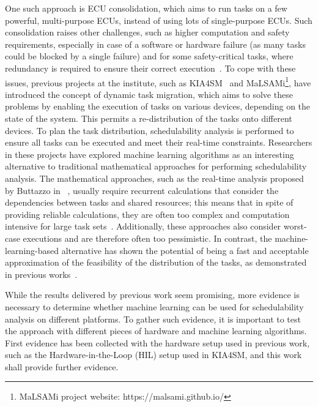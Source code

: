 One such approach is ECU consolidation, which aims to run tasks on a few powerful, multi-purpose ECUs, instead of using lots of single-purpose ECUs. Such consolidation raises other challenges, such as higher computation and safety requirements, especially in case of a software or hardware failure (as many tasks could be blocked by a single failure) and for some safety-critical tasks, where redundancy is required to ensure their correct execution~\parencite{mundhenk1}. To cope with these issues, previous projects at the institute, such as KIA4SM~\parencite{kia1} and MaLSAMi\footnote{MaLSAMi project website: https://malsami.github.io/}, have introduced the concept of dynamic task migration, which aims to solve these problems by enabling the execution of tasks on various devices, depending on the state of the system. This permits a re-distribution of the tasks onto different devices. To plan the task distribution, schedulability analysis is performed to ensure all tasks can be executed and meet their real-time constraints. Researchers in these projects have explored machine learning algorithms as an interesting alternative to traditional mathematical approaches for performing schedulability analysis. The mathematical approaches, such as the real-time analysis proposed by Buttazzo in ~\parencite{buttazzo1}, usually require recurrent calculations that consider the dependencies between tasks and shared resources; this means that in spite of providing reliable calculations, they are often too complex and computation intensive for large task sets~\parencite{utz1,navet1}. Additionally, these approaches also consider worst-case executions and are therefore often too pessimistic. In contrast, the machine-learning-based alternative has shown the potential of being a fast and acceptable approximation of the feasibility of the distribution of the tasks, as demonstrated in previous works~\parencite{taieb1, utz1, blieninger1}. 

While the results delivered by previous work seem promising, more evidence is necessary to determine whether machine learning can be used for schedulability analysis on different platforms. To gather such evidence, it is important to test the approach with different pieces of hardware and machine learning algorithms. First evidence has been collected with the hardware setup used in previous work, such as the Hardware-in-the-Loop (HIL) setup used in KIA4SM, and this work shall provide further evidence.


